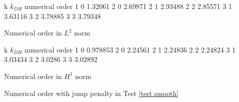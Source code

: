 \begin{table}[H]
\centering
\begin{subtable}[b]{0.45\textwidth}
	\centering
	\pgfplotstabletypeset
	{
		k $k_{DH}$ {numerical order}
		1 0 1.32061
		2 0 2.69871
		2 1 2.93488
		2 2 2.85571
		3 1 3.63116 
		3 2 3.78885
		3 3 3.79348
	}
	\caption{Numerical order in $L^2$ norm}
	\end{subtable}
	\begin{subtable}[b]{0.45\textwidth}
	\centering
	\pgfplotstabletypeset
	{
		k $k_{DH}$ {numerical order}
		1 0 0.978853
		2 0 2.24561
		2 1 2.24836
		2 2 2.24824
		3 1 3.03434
		3 2 3.0286
		3 3 3.02892
	}
	\caption{Numerical order in $H^1$ norm}
	\end{subtable}
	\caption{Numerical order with jump penalty in Test \ref{test smooth}}
\label{tab: order jump}
\end{table}
